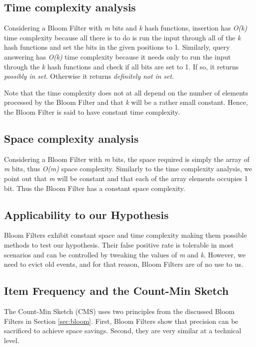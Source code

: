 \subsection*{Time complexity analysis}
Considering a Bloom Filter with \textit{m} bits and \textit{k} hash functions, insertion has \textit{O(k)} time complexity because all there is to do is run the input through all of the \textit{k} hash functions and set the bits in the given positions to 1. Similarly, query answering has \textit{O(k)} time complexity because it needs only to run the input through the \textit{k} hash functions and check if all bits are set to 1. If so, it returns \textit{possibly in set}. Otherwise it returns \textit{definitely not in set}. 

Note that the time complexity does not at all depend on the number of elements processed by the Bloom Filter and that \textit{k} will be a rather small constant. Hence, the Bloom Filter is said to have constant time complexity.

\subsection*{Space complexity analysis}
Considering a Bloom Filter with \textit{m} bits, the space required is simply the array of \textit{m} bits, thus \textit{O(m)} space complexity. Similarly to the time complexity analysis, we point out that \textit{m} will be constant and that each of the array elements occupies 1 bit. Thus the Bloom Filter has a constant space complexity.

\subsection*{Applicability to our Hypothesis}
Bloom Filters exhibit constant space and time complexity making them possible methods to test our hypothesis. Their false positive rate is tolerable in most scenarios and can be controlled by tweaking the values of \textit{m} and \textit{k}. However, we need to evict old events, and for that reason, Bloom Filters are of no use to us.

\subsection{Item Frequency and the Count-Min Sketch}
The Count-Min Sketch (CMS) uses two principles from the discussed Bloom Filters in Section \ref{sec:bloom}. First, Bloom Filters show that precision can be sacrificed to achieve space savings. Second, they are very similar at a technical level.

